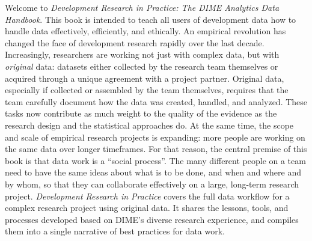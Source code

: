 \begin{fullwidth}
Welcome to \textit{Development Research in Practice: The DIME Analytics Data Handbook}.
This book is intended to teach all users of development data
how to handle data effectively, efficiently, and ethically.
An empirical revolution has changed the face of development research rapidly over the last decade.
Increasingly, researchers are working not just with complex data,
but with \textit{original} data:
datasets either collected by the research team themselves
or acquired through a unique agreement with a project partner.
Original data, especially if collected or assembled by the team themselves,
requires that the team carefully document how the data was created, handled, and analyzed.
These tasks now contribute as much weight to the quality of the evidence
as the research design and the statistical approaches do.
At the same time, the scope and scale of empirical research projects is expanding:
more people are working on the same data over longer timeframes.
For that reason, the central premise of this book is that data work is a ``social process''.
The many different people on a team need to have the same ideas
about what is to be done, and when and where and by whom,
so that they can collaborate effectively on a large, long-term research project.
\textit{Development Research in Practice} covers the full data workflow for a complex research project using original data.
It shares the lessons, tools, and processes developed based on DIME's diverse research experience,
and compiles them into a single narrative of best practices for data work.

\end{fullwidth}


